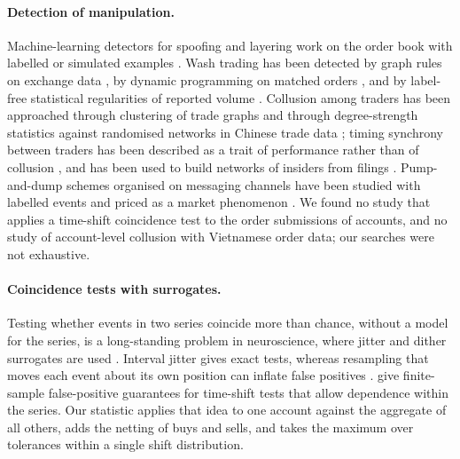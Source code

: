 \documentclass[11pt,a4paper]{article}
\begin{document}
\paragraph{Detection of manipulation.} Machine-learning detectors for spoofing and layering work on the order book with labelled or simulated examples \citep{tuccella2021,fabre2025}. Wash trading has been detected by graph rules on exchange data \citep{victor2021}, by dynamic programming on matched orders \citep{cao2016}, and by label-free statistical regularities of reported volume \citep{cong2023}. Collusion among traders has been approached through clustering of trade graphs \citep{palshikar2008} and through degree-strength statistics against randomised networks in Chinese trade data \citep{sun2012}; timing synchrony between traders has been described as a trait of performance rather than of collusion \citep{saavedra2011}, and has been used to build networks of insiders from filings \citep{jaeger2025}. Pump-and-dump schemes organised on messaging channels have been studied with labelled events \citep{xu2019,lamorgia2020,lamorgia2023,hu2022} and priced as a market phenomenon \citep{dhawan2023}. We found no study that applies a time-shift coincidence test to the order submissions of accounts, and no study of account-level collusion with Vietnamese order data; our searches were not exhaustive.

\paragraph{Coincidence tests with surrogates.} Testing whether events in two series coincide more than chance, without a model for the series, is a long-standing problem in neuroscience, where jitter and dither surrogates are used \citep{amarasingham2012,louis2010,grun2009}. Interval jitter gives exact tests, whereas resampling that moves each event about its own position can inflate false positives \citep{platkiewicz2017}. \citet{liang2025} give finite-sample false-positive guarantees for time-shift tests that allow dependence within the series. Our statistic applies that idea to one account against the aggregate of all others, adds the netting of buys and sells, and takes the maximum over tolerances within a single shift distribution.
\end{document}
